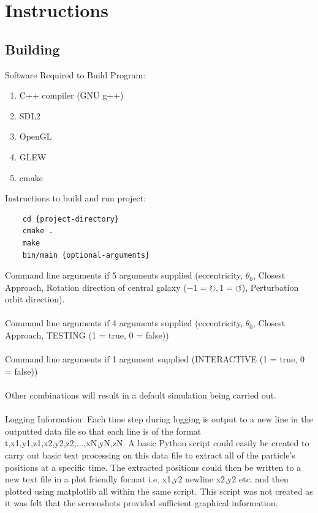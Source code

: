 \documentclass[10pt,a4paper]{article}
\begin{document}
\clearpage
\section{Instructions}
\subsection{Building}
Software Required to Build Program:
\\
\begin{enumerate}
\item C++ compiler (GNU g++)
\item SDL2
\item OpenGL
\item GLEW
\item cmake
\end{enumerate}

Instructions to build and run project:

\begin{lstlisting}
	cd {project-directory}
	cmake .
	make
	bin/main {optional-arguments}
\end{lstlisting}
Command line arguments if 5 arguments supplied (eccentricity, $\theta_0$, Closest Approach, Rotation direction of central galaxy ($-1=\circlearrowright, 1=\circlearrowleft$), Perturbation orbit direction).
\\
\\
Command line arguments if 4 arguments supplied (eccentricity, $\theta_0$, Closest Approach, TESTING (1 = true, 0 = false))
\\
\\
Command line arguments if 1 argument supplied (INTERACTIVE (1 = true, 0 = false))
\\
\\
Other combinations will result in a default simulation being carried out.
\\
\\
Logging Information: Each time step during logging is output to a new line in the outputted data file so that each line is of the format t,{x1,y1,z1},{x2,y2,z2},...,{xN,yN,zN}. A basic Python script could easily be created to carry out basic text processing on this data file to extract all of the particle's positions at a specific time. The extracted positions could then be written to a new text file in a plot friendly format i.e. x1,y2 {newline} x2,y2 etc. and then plotted using matplotlib all within the same script. This script was not created as it was felt that the screenshots provided sufficient graphical information.
\end{document}
